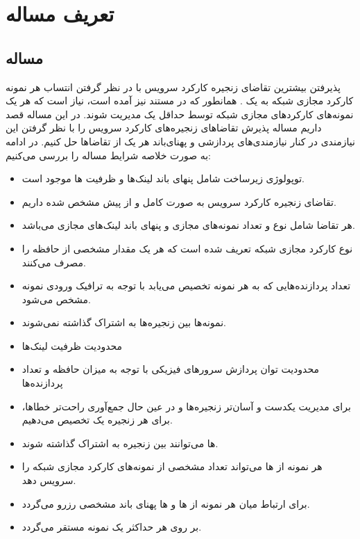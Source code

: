 \chapter{تعریف مساله}

\section{مساله}
پذیرفتن بیشترین تقاضای زنجیره‌ کارکرد سرویس با در نظر گرفتن انتساب هر نمونه کارکرد مجازی شبکه به یک .
همانطور که در مستند \cite{ETSI-MAN} نیز آمده است، نیاز است که هر یک نمونه‌های کارکردهای مجازی شبکه
توسط حداقل یک  مدیریت شوند.
در این مساله قصد داریم مساله پذیرش تقاضاهای زنجیره‌های کارکرد سرویس را با نظر گرفتن این نیازمندی در کنار
نیازمندی‌های پردازشی و پهنای‌باند هر یک از تقاضاها حل کنیم.
در ادامه به صورت خلاصه شرایط مساله را بررسی می‌کنیم:

\begin{itemize}
    \item توپولوژی زیرساخت شامل پنهای باند لینک‌ها و ظرفیت ها موجود است.
    \item {} تقاضای زنجیره‌ کارکرد سرویس به صورت کامل و از پیش مشخص شده داریم.
    \item هر تقاضا شامل نوع و تعداد نمونه‌های مجازی و پنهای باند لینک‌های مجازی می‌باشد.
    \item {} نوع کارکرد مجازی شبکه تعریف شده است که هر یک مقدار مشخصی از حافظه را مصرف می‌کنند.
    \item تعداد پردازنده‌هایی که به هر نمونه تخصیص می‌یابد با توجه به ترافیک ورودی نمونه مشخص می‌شود.
    \item نمونه‌ها بین زنجیره‌ها به اشتراک گذاشته نمی‌شوند.
    \item محدودیت ظرفیت لینک‌ها
    \item محدودیت توان پردازش سرورهای فیزیکی با توجه به میزان حافظه و تعداد پردازنده‌ها
    \item برای مدیریت یکدست و آسان‌تر زنجیره‌ها و در عین حال جمع‌آوری راحت‌تر خطاها، برای هر زنجیره یک  تخصیص می‌دهیم.
    \item {}ها می‌توانند بین زنجیره به اشتراک گذاشته شوند.
    \item هر نمونه از ها می‌تواند تعداد مشخصی از نمونه‌های کارکرد مجازی شبکه را سرویس دهد. 
    \item برای ارتباط میان هر نمونه از ها و ها پهنای باند مشخصی رزرو می‌گردد.
    \item بر روی هر  حداکثر یک نمونه  مستقر می‌گردد.
\end{itemize}

